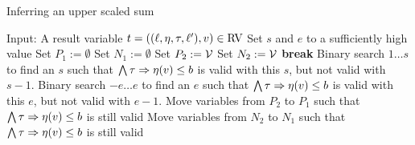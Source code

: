 \begin{algorithm}
\caption{Inferring an upper scaled sum}\label{ulsb_algorithm}
\begin{algorithmic}[1]
  \State Input: A result variable $t = ((\ell,\eta,\tau,\ell'),v) \in \text{RV}$
  \State Set $s$ and $e$ to a sufficiently high value
  \State Set $P_1 := \emptyset$
  \State Set $N_1 := \emptyset$
    \State Set $P_2 := \mathcal{V}$
    \State Set $N_2 := \mathcal{V}$
      \State \textbf{break}
    \EndIf
  \EndFor
  \State Binary search $1 \dots s$ to find an $s$ such that $\bigwedge \tau \Rightarrow \eta(v) \leq b$ is valid with this $s$, but not valid with $s-1$.
  \State Binary search $-e \dots e$ to find an $e$ such that $\bigwedge \tau \Rightarrow \eta(v) \leq b$ is valid with this $e$, but not valid with $e-1$.
  \State Move variables from $P_2$ to $P_1$ such that $\bigwedge \tau \Rightarrow \eta(v) \leq b$ is still valid
  \State Move variables from $N_2$ to $N_1$ such that $\bigwedge \tau \Rightarrow \eta(v) \leq b$ is still valid
\end{algorithmic}
\end{algorithm}
